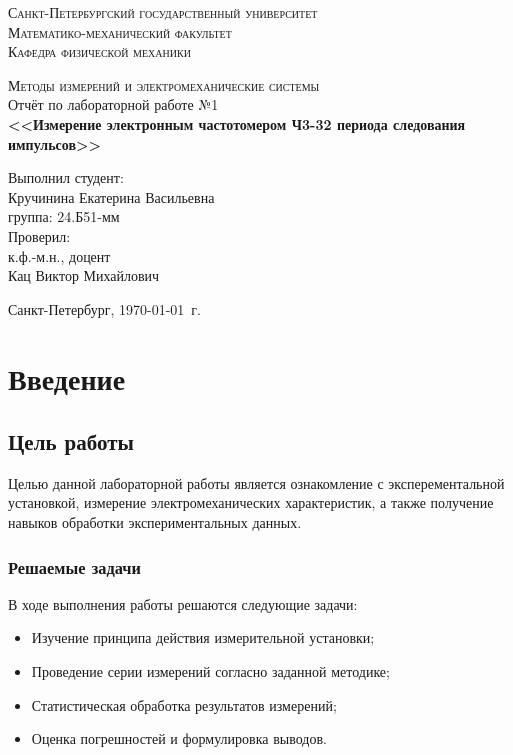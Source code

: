\documentclass[a4paper,14pt]{extarticle}
\theoremstyle{plain}
\theoremstyle{remark}
\theoremstyle{definition}
\begin{document}
\begin{titlepage}
\begin{center}
\textsc{Санкт-Петербургский государственный университет\\
Математико-механический факультет\\
Кафедра физической механики\\}

\vfill

\textsc{Методы измерений и электромеханические системы\\[3mm]}
Отчёт по лабораторной работе №1\\[6mm]


\textbf{\large<<Измерение электронным частотомером Ч3-32 периода следования импульсов>>}

\vfill
\end{center}

\hfill
\begin{minipage}{.5\textwidth}
Выполнил студент:\\[2mm] 
Кручинина Екатерина Васильевна\\
группа: 24.Б51-мм\\[5mm]

Проверил:\\[2mm] 
к.ф.-м.н., доцент\\
Кац Виктор Михайлович
\end{minipage}%
\vfill
\begin{center}
 Санкт-Петербург, \yeardate\today\ г.
\end{center}
\end{titlepage}
\tableofcontents
\newpage
\section{Введение}
\subsection{Цель работы}
Целью данной лабораторной работы является ознакомление с эксперементальной установкой, измерение электромеханических характеристик, а также получение навыков обработки экспериментальных данных.


\subsubsection{Решаемые задачи}
В ходе выполнения работы решаются следующие задачи:
\begin{itemize}
    \item Изучение принципа действия измерительной установки;
    \item Проведение серии измерений согласно заданной методике;
    \item Статистическая обработка результатов измерений;
    \item Оценка погрешностей и формулировка выводов.
\end{itemize}
\end{document}
